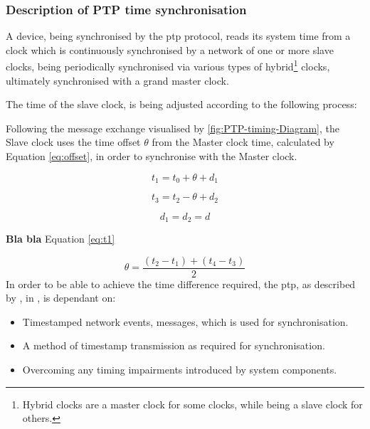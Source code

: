 \subsubsection{Description of PTP time synchronisation}



A device, being synchronised  by the \acrshort{ptp} protocol, reads its system time from a clock which is continuously synchronised by a network of one or more slave clocks, being periodically synchronised via various types of hybrid\footnote{Hybrid clocks are a master clock for some clocks, while being a slave clock for others.} clocks, ultimately synchronised with a grand master clock.


The time of the slave clock, is being adjusted according to the following process:


Following the message exchange visualised by \figureautorefname { } \ref{fig:PTP-timing-Diagram}, the Slave clock  uses the time offset $\theta$ from the Master clock time, calculated by Equation \ref{eq:offset}, in order to synchronise with the Master clock. 


\begin{equation}
t_1 = t_0 + \theta + d_1 \label{eq:t1}
\end{equation}


\begin{equation}
t_3 = t_2 - \theta + d_2
\end{equation}

\begin{equation}
d_1 = d_2 = d
\end{equation}

\textbf{Bla bla }Equation \ref{eq:t1}

\begin{equation}
\theta = \frac{(t_2 - t_1) + (t_4 - t_3)}{2} \label{eq:offset}
\end{equation}
In order to be able to achieve the time difference required, the \acrshort{ptp}, as described by  \citeauthor{Eidson2006}, in \cite{Eidson2006}, is dependant on:

\begin{itemize}
    \item Timestamped network events, messages, which is  used for synchronisation.
    \item A method of timestamp transmission as required for synchronisation.
    \item Overcoming any timing impairments introduced by system components.
\end{itemize}





